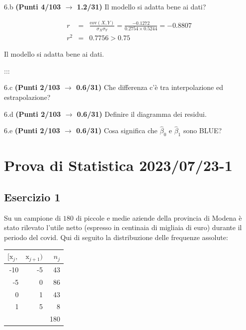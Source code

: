 \documentclass[
  11pt,
]{book}
\theoremstyle{mytheoremstyle}
\theoremstyle{mydefstyle}
\newenvironment{sol}
  {
  \begin{tcolorbox}[enhanced,breakable,arc=0.1mm,boxrule=1pt,colback=white,colframe=iblue,
  title=\bf \fontfamily{lmss}\selectfont \hspace{.5 cm} Soluzione,drop fuzzy shadow]

}{
\end{tcolorbox}
  }
\begin{document}
6.b \textbf{(Punti 4/103 \(\rightarrow\) 1.2/31)} Il modello si adatta bene ai dati?

\begin{sol}
\begin{eqnarray*}
r&=&\frac{\text{cov}(X,Y)}{\sigma_X\sigma_Y}=\frac{ -0.1272 }{ 0.2754 \times 0.5244 }= -0.8807 \\ 
r^2&=& 0.7756 > 0.75
\end{eqnarray*}

Il modello si adatta bene ai dati.

\end{sol}

:::

6.c \textbf{(Punti 2/103 \(\rightarrow\) 0.6/31)} Che differenza c'è tra interpolazione ed estrapolazione?

6.d \textbf{(Punti 2/103 \(\rightarrow\) 0.6/31)} Definire il diagramma dei residui.

6.e \textbf{(Punti 2/103 \(\rightarrow\) 0.6/31)} Cosa significa che \(\hat\beta_0\) e \(\hat\beta_1\) sono BLUE?

\section{Prova di Statistica 2023/07/23-1}\label{prova-di-statistica-20230723-1}

\subsection{Esercizio 1}\label{esercizio-1-31}

Su un campione di \(180\) di piccole e medie aziende della provincia di Modena è stato rilevato l'utile netto (espresso in centinaia di migliaia di euro) durante il periodo del covid. Qui di seguito la distribuzione delle frequenze assolute:

\begin{table}[H]
\centering
\begin{tabular}{rrr}
\toprule
$[\text{x}_j,$ & $\text{x}_{j+1})$ & $n_j$\\
\midrule
-10 & -5 & 43\\
-5 & 0 & 86\\
0 & 1 & 43\\
1 & 5 & 8\\
 &  & 180\\
\bottomrule
\end{tabular}
\end{table}
\end{document}
